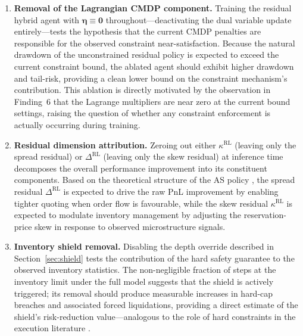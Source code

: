 \documentclass[11pt]{article}
\begin{document}
\begin{enumerate}[leftmargin=*, label=(\arabic*), itemsep=6pt]
  \item \textbf{Removal of the Lagrangian CMDP component.}
    Training the residual hybrid agent with $\boldsymbol{\eta} \equiv \mathbf{0}$
    throughout---deactivating the dual variable update entirely---tests
    the hypothesis that the current CMDP penalties are responsible for
    the observed constraint near-satisfaction.
    Because the natural drawdown of the unconstrained residual policy is
    expected to exceed the current constraint bound, the ablated agent
    should exhibit higher drawdown and tail-risk, providing a clean
    lower bound on the constraint mechanism's contribution.
    This ablation is directly motivated by the observation in
    Finding~6 that the Lagrange multipliers are near zero at the current
    bound settings, raising the question of whether any constraint
    enforcement is actually occurring during training.

  \item \textbf{Residual dimension attribution.}
    Zeroing out either $\kappa^{\text{RL}}$ (leaving only the spread
    residual) or $\Delta^{\text{RL}}$ (leaving only the skew residual)
    at inference time decomposes the overall performance improvement into
    its constituent components.
    Based on the theoretical structure of the AS policy
    \parencite{avellaneda2008hftlob,gueant2013inventory}, the spread
    residual $\Delta^{\text{RL}}$ is expected to drive the raw PnL
    improvement by enabling tighter quoting when order flow is favourable,
    while the skew residual $\kappa^{\text{RL}}$ is expected to modulate
    inventory management by adjusting the reservation-price skew in
    response to observed microstructure signals.

  \item \textbf{Inventory shield removal.}
    Disabling the depth override described in Section~\ref{sec:shield}
    tests the contribution of the hard safety guarantee to the observed
    inventory statistics.
    The non-negligible fraction of steps at the inventory limit under
    the full model suggests that the shield is actively triggered; its
    removal should produce measurable increases in hard-cap breaches
    and associated forced liquidations, providing a direct estimate of
    the shield's risk-reduction value---analogous to the role of
    hard constraints in the execution literature
    \parencite{almgren2001optimal,cartea2015execution}.


\end{enumerate}
\end{document}
